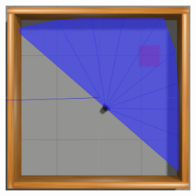 \begin{figure}[H]
\begin{center}
\begin{subfigure}[b]{0.60\textwidth}
\begin{subfigure}[b]{0.24\textwidth}
        \end{subfigure}
        \hfill
        \begin{subfigure}[b]{0.24\textwidth}
            \includegraphics[width=\textwidth]{imagens/simulated_envs/sim_env1_ddpg/4.png}
        \end{subfigure}
        

\end{subfigure}
\end{center}
\end{figure}
